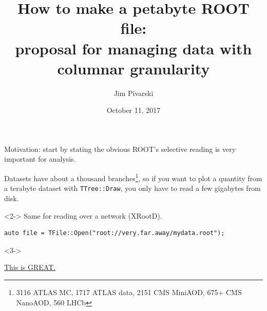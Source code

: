 \documentclass[aspectratio=169]{beamer}
\title[2017-10-11-rootioworkshop-petabyte-file]{How to make a petabyte ROOT file: \\ proposal for managing data with columnar granularity}
\author{Jim Pivarski}
\institute{Princeton University -- DIANA}
\date{October 11, 2017}
\begin{document}

\begin{frame}
  \titlepage
\end{frame}




\begin{frame}[fragile]{Motivation: start by stating the obvious}
\vspace{0.15 cm}
ROOT's selective reading is very important for analysis.

\vspace{0.25 cm}
Datasets have about a thousand branches\footnote{3116 ATLAS MC, 1717 ATLAS data, 2151 CMS MiniAOD, 675+ CMS NanoAOD, 560 LHCb}, so if you want to plot a quantity from a terabyte dataset with {\tt TTree::Draw}, you only have to read a few gigabytes from disk.

\begin{uncoverenv}<2->
\vspace{1 cm}
Same for reading over a network (XRootD).
\begin{verbatim}
auto file = TFile::Open("root://very.far.away/mydata.root");
\end{verbatim}
\end{uncoverenv}

\vspace{0.1 cm}
\begin{uncoverenv}<3->
\begin{center}
\LARGE \underline{This is GREAT.}
\end{center}
\end{uncoverenv}
\end{frame}
\end{document}
